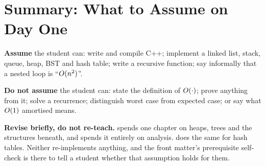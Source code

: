 \section{Summary: What to Assume on Day One}

\begin{alertbox}
\textbf{Assume} the student can: write and compile C++; implement a linked
list, stack, queue, heap, BST and hash table; write a recursive function; say
informally that a nested loop is ``$O(n^{2})$''.

\smallskip
\textbf{Do not assume} the student can: state the definition of $O(\cdot)$;
prove anything from it; solve a recurrence; distinguish worst case from
expected case; or say what $O(1)$ amortised means.

\smallskip
\textbf{Revise briefly, do not re-teach.}  spends one chapter
on heaps, trees and the structures beneath, and spends it entirely on analysis.
 does the same for hash tables. Neither re-implements anything,
and the front matter's prerequisite self-check is there to tell a student
whether that assumption holds for them.
\end{alertbox}
